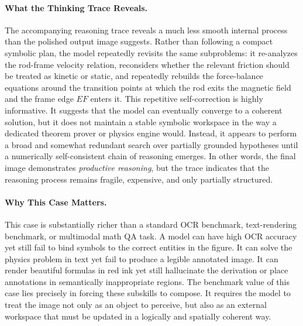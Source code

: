 \paragraph{What the Thinking Trace Reveals.}
The accompanying reasoning trace reveals a much less smooth internal process than the polished output image suggests. Rather than following a compact symbolic plan, the model repeatedly revisits the same subproblems: it re-analyzes the rod-frame velocity relation, reconsiders whether the relevant friction should be treated as kinetic or static, and repeatedly rebuilds the force-balance equations around the transition points at which the rod exits the magnetic field and the frame edge $EF$ enters it. This repetitive self-correction is highly informative. It suggests that the model can eventually converge to a coherent solution, but it does not maintain a stable symbolic workspace in the way a dedicated theorem prover or physics engine would. Instead, it appears to perform a broad and somewhat redundant search over partially grounded hypotheses until a numerically self-consistent chain of reasoning emerges. In other words, the final image demonstrates \emph{productive reasoning}, but the trace indicates that the reasoning process remains fragile, expensive, and only partially structured.

\paragraph{Why This Case Matters.}
This case is substantially richer than a standard OCR benchmark, text-rendering benchmark, or multimodal math QA task. A model can have high OCR accuracy yet still fail to bind symbols to the correct entities in the figure. It can solve the physics problem in text yet fail to produce a legible annotated image. It can render beautiful formulas in red ink yet still hallucinate the derivation or place annotations in semantically inappropriate regions. The benchmark value of this case lies precisely in forcing these subskills to compose. It requires the model to treat the image not only as an object to perceive, but also as an external workspace that must be updated in a logically and spatially coherent way.

